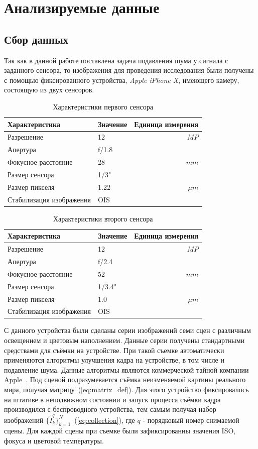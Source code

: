 \section{Анализируемые данные}
\subsection{Сбор данных}
Так как в данной работе поставлена задача подавления шума у сигнала с заданного сенсора, то изображения для проведения исследования были получены с помощью фиксированного устройства, \textit{Apple iPhone X}, имеющего камеру, состоящую из двух сенсоров.

\begin{table}[h!]
	\centering
	\caption{\label{tab:cam1}Характеристики первого сенсора}
	\begin{tabular}{llr}
		\toprule
		Характеристика  & Значение    & Единица измерения \\
		\midrule
		Разрешение & 12    & $MP$  \\
		Апертура & f/1.8 & \\
		Фокусное расстояние & 28 & $mm$ \\
		Размер сенсора & 1/3" & \\
		Размер пикселя & 1.22 & $\mu m$ \\
		Стабилизация изображения & OIS & \\
		\bottomrule
	\end{tabular}
\end{table}

\begin{table}[h!]
	\centering
	\caption{\label{tab:cam2}Характеристики второго сенсора}
	\begin{tabular}{llr}
		\toprule
		Характеристика  & Значение    & Единица измерения \\
		\midrule
		Разрешение & 12    & $MP$  \\
		Апертура & f/2.4 & \\
		Фокусное расстояние & 52 & $mm$ \\
		Размер сенсора & 1/3.4" & \\
		Размер пикселя & 1.0 & $\mu m$ \\
		Стабилизация изображения & OIS & \\
		\bottomrule
	\end{tabular}
\end{table}

С данного устройства были сделаны серии изображений семи сцен с различным освещением и цветовым наполнением. Данные серии получены стандартными средствами для съёмки на устройстве. При такой съемке автоматически применяются алгоритмы улучшения кадра на устройстве, в том числе и подавление шума. Данные алгоритмы являются коммерческой тайной компании Apple~\autocite{APPLElink}. Под сценой подразумевается съёмка неизменяемой картины реального мира, получая матрицу~(\ref{eq:matrix_def}). Для этого устройство фиксировалось на штативе в неподвижном состоянии  и запуск процесса съёмки кадра производился  с беспроводного устройства, тем самым получая набор изображений $\{\tilde{I}^q_k\}_{k=1}^{N}$~(\ref{eq:collection}), где $q$ - порядковый номер снимаемой сцены. Для каждой сцены при съемке были зафиксированны значения ISO, фокуса и цветовой температуры. 

